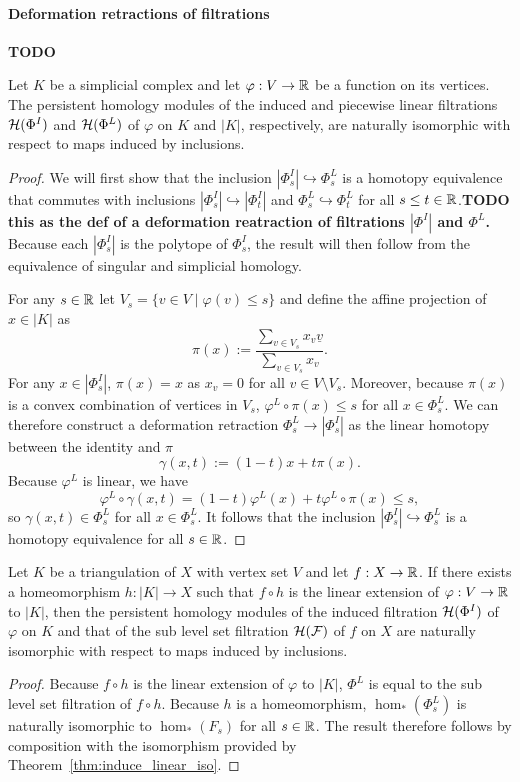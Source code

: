 \paragraph{Deformation retractions of filtrations}\textbf{TODO}

\begin{theorem}\label{thm:induce_linear_iso}
  Let $K$ be a simplicial complex and let $\varphi : V\to\mathbb{R}$ be a function on its vertices.
  The persistent homology modules of the induced and piecewise linear filtrations $\mathcal{H}(\Phi^I)$ and $\mathcal{H}(\Phi^L)$ of $\varphi$ on $K$ and $|K|$, respectively, are naturally isomorphic with respect to maps induced by inclusions.
\end{theorem}
\begin{proof}
  We will first show that the inclusion $|\Phi^I_s|\hookrightarrow \Phi^L_s$ is a homotopy equivalence that commutes with inclusions $|\Phi^I_s|\hookrightarrow |\Phi^I_t|$ and $\Phi^L_s\hookrightarrow \Phi^L_t$ for all $s\leq t\in\mathbb{R}$.\textbf{TODO this as the def of a deformation reatraction of filtrations $|\Phi^I|$ and $\Phi^L$.}
  Because each $|\Phi^I_s|$ is the polytope of $\Phi^I_s$, the result will then follow from the equivalence of singular and simplicial homology.

  For any $s\in\mathbb{R}$ let $V_s = \{ v\in V\mid \varphi(v)\leq s\}$ and define the affine projection of $x\in |K|$ as
  \[ \pi(x) := \frac{\sum_{v\in V_s} x_v \underline{v}}{\sum_{v\in V_s} x_v}.\]
  For any $x\in |\Phi_s^I|$, $\pi(x) = x$ as $x_v = 0$ for all $v\in V\setminus V_s$.
  Moreover, because $\pi(x)$ is a convex combination of vertices in $V_s$, $\varphi^L\circ \pi(x)\leq s$ for all $x\in\Phi_s^L$.
  We can therefore construct a deformation retraction $\Phi^L_s\to |\Phi^I_s|$ as the linear homotopy between the identity and $\pi$
  \[ \gamma(x, t) := (1-t)x + t\pi(x).\]
  Because $\varphi^L$ is linear, we have
  \[ \varphi^L\circ \gamma(x,t) = (1-t)\varphi^L(x) + t\varphi^L\circ \pi(x)\leq s,\]
  so $\gamma(x,t)\in\Phi_s^L$ for all $x\in \Phi_s^L$.
  It follows that the inclusion $|\Phi^I_s|\hookrightarrow \Phi^L_s$ is a homotopy equivalence for all $s\in\mathbb{R}$.
\end{proof}


\begin{corollary}\label{cor:induce_sublevel_iso}
  Let $K$ be a triangulation of $X$ with vertex set $V$ and let $f : X\to \mathbb{R}$.
  If there exists a homeomorphism $h : |K|\to X$ such that $f\circ h$ is the linear extension of $\varphi : V\to \mathbb{R}$ to $|K|$, then the persistent homology modules of the induced filtration $\mathcal{H}(\Phi^I)$ of $\varphi$ on $K$ and that of the sub level set filtration $\mathcal{H}(\mathcal{F})$ of $f$ on $X$ are naturally isomorphic with respect to maps induced by inclusions.
\end{corollary}
\begin{proof}
  Because $f\circ h$ is the linear extension of $\varphi$ to $|K|$, $\Phi^L$ is equal to the sub level set filtration of $f\circ h$.
  Because $h$ is a homeomorphism, $\hom_*(\Phi_s^L)$ is naturally isomorphic to $\hom_*(F_s)$ for all $s\in\mathbb{R}$.
  The result therefore follows by composition with the isomorphism provided by Theorem~\ref{thm:induce_linear_iso}.
\end{proof}
